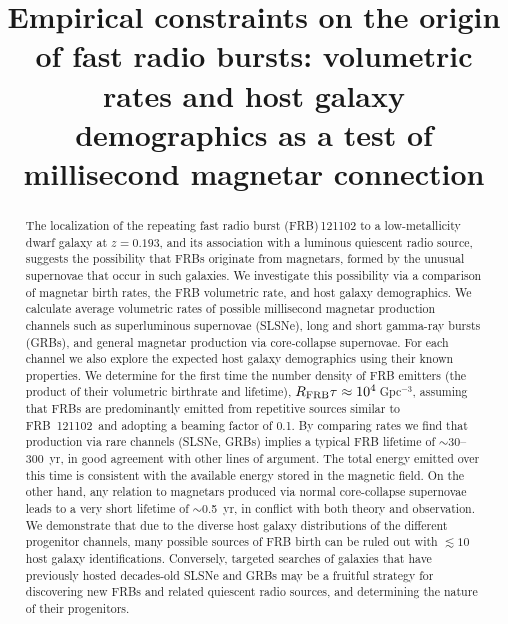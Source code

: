 \documentclass[twocolumn]{aastex6}
\newcommand{\apx}{\ensuremath{\sim}}
\newcommand{\repeater}{FRB~121102}
\begin{document}
\title{Empirical constraints on the origin of fast radio bursts: volumetric rates and host galaxy demographics as a test of millisecond magnetar connection}




\begin{abstract}
The localization of the repeating fast radio burst (FRB)\,121102 to a low-metallicity dwarf galaxy at $z=0.193$, and its association with a luminous quiescent radio source, suggests the possibility that FRBs originate from magnetars, formed by the unusual supernovae that occur in such galaxies. We investigate this possibility via a comparison of magnetar birth rates, the FRB volumetric rate, and host galaxy demographics.  We calculate average volumetric rates of possible millisecond magnetar production channels such as superluminous supernovae (SLSNe), long and short gamma-ray bursts (GRBs), and general magnetar production via core-collapse supernovae.  For each channel we also explore the expected host galaxy demographics using their known properties. We determine for the first time the number density of FRB emitters (the product of their volumetric birthrate and lifetime), $R_{\rm FRB}\tau\approx 10^4$\,Gpc$^{-3}$, assuming that FRBs are predominantly emitted from repetitive sources similar to \repeater\ and adopting a beaming factor of 0.1.  By comparing rates we find that production via rare channels (SLSNe, GRBs) implies a typical FRB lifetime of \apx30--300~yr, in good agreement with other lines of argument. The total energy emitted over this time is consistent with the available energy stored in the magnetic field. On the other hand, any relation to magnetars produced via normal core-collapse supernovae leads to a very short lifetime of \apx0.5~yr, in conflict with both theory and observation. We demonstrate that due to the diverse host galaxy distributions of the different progenitor channels, many possible sources of FRB birth can be ruled out with $\lesssim 10$ host galaxy identifications. Conversely, targeted searches of galaxies that have previously hosted decades-old SLSNe and GRBs may be a fruitful strategy for discovering new FRBs and related quiescent radio sources, and determining the nature of their progenitors.
\end{abstract}
\end{document}
